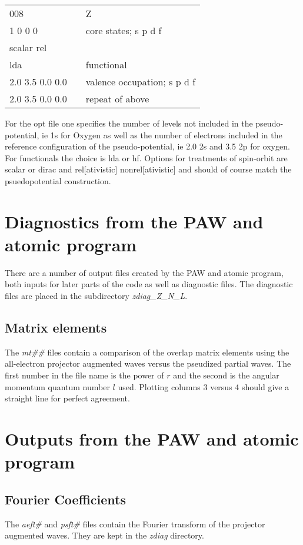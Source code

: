 \documentclass[11pt]{report}
\begin{document}
\begin{center}
\begin{tabular}{| l | c l |}
\hline
008				& &  Z\\
1 0 0 0			& & core states; s p d f \\
scalar rel			& & \\
lda				& & functional \\
2.0 3.5 0.0 0.0		& & valence occupation; s p d f \\
2.0 3.5 0.0 0.0		& & repeat of above \\
\hline
\end{tabular}
\end{center}

For the opt file one specifies the number of levels not included in the pseudo-potential, ie 1s for Oxygen as well as the number of electrons included in the reference configuration of the pseudo-potential, ie 2.0 2s and 3.5 2p for oxygen. For functionals the choice is lda or hf. Options for treatments of spin-orbit are 
scalar or dirac and rel[ativistic] nonrel[ativistic] and should of course match the psuedopotential 
construction. 

\section{Diagnostics from the PAW and atomic program}
There are a number of output files created by the PAW and atomic program, both inputs for later parts of the code as well as diagnostic files. The diagnostic files are placed in the subdirectory \emph{zdiag\_Z\_N\_L}. 

\subsection{Matrix elements}
The \emph{mt\#\#} files contain a comparison of the overlap matrix elements using the all-electron projector augmented waves versus the pseudized partial waves. The first number in the 
file name is the power of $r$ and the second is the angular momentum quantum number $l$ used. Plotting columns 3 versus 4 should give a straight line for perfect 
agreement.

\section{Outputs from the PAW and atomic program}

\subsection{Fourier Coefficients}
The \emph{aeft\#} and \emph{psft\#} files contain the Fourier transform of the projector augmented waves. They are kept in the \emph{zdiag} directory.
\end{document}
